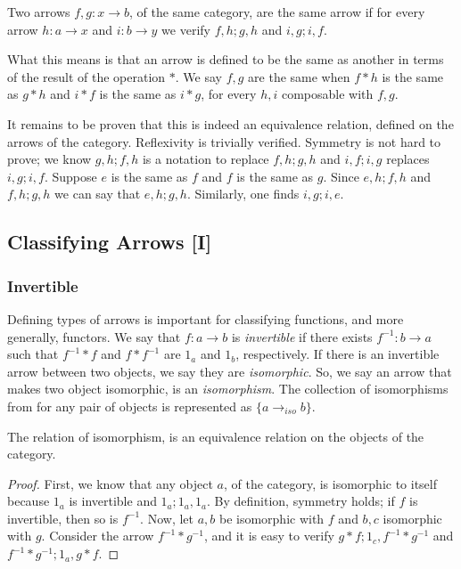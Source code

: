 \documentclass [12pt]{book}
\begin{document}
\begin{definition}Two arrows $f,g:x\rightarrow b$, of the same category, are the same arrow if for every arrow $h:a\rightarrow x$ and $i:b\rightarrow y$ we verify $f,h;g,h$ and $i,g;i,f$.\end{definition}

What this means is that an arrow is defined to be the same as another in terms of the result of the operation $*$. We say $f,g$ are the same when $f*h$ is the same as $g*h$ and $i*f$ is the same as $i*g$, for every $h,i$ composable with $f,g$.

\newpage

It remains to be proven that this is indeed an equivalence relation, defined on the arrows of the category. Reflexivity is trivially verified. Symmetry is not hard to prove; we know $g,h;f,h$ is a notation to replace $f,h;g,h$ and $i,f;i,g$ replaces $i,g;i,f$. Suppose $e$ is the same as $f$ and $f$ is the same as $g$. Since $e,h;f,h$ and $f,h;g,h$ we can say that $e,h;g,h$. Similarly, one finds $i,g;i,e$.

		\subsection{Classifying Arrows [I]}

\subsubsection{Invertible}Defining types of arrows is important for classifying functions, and more generally, functors. We say that $f:a\rightarrow b$ is \textit{invertible} if there exists $f^{-1}:b\rightarrow a$ such that $f^{-1}*f$ and $f*f^{-1}$ are $1_a$ and $1_b$, respectively. If there is an invertible arrow between two objects, we say they are \textit{isomorphic}. So, we say an arrow that makes two object isomorphic, is an \textit{isomorphism}. The collection of isomorphisms from for any pair of objects is represented as $\{a\rightarrow_{iso}b\}$.

\begin{proposition}The relation of isomorphism, is an equivalence relation on the objects of the category.\end{proposition}

\begin{proof}First, we know that any object $a$, of the category, is isomorphic to itself because $1_a$ is invertible and $1_a;1_a,1_a$. By definition, symmetry holds; if $f$ is invertible, then so is $f^{-1}$. Now, let $a,b$ be isomorphic with $f$ and $b,c$ isomorphic with $g$. Consider the arrow $f^{-1}*g^{-1}$, and it is easy to verify $g*f;1_c,f^{-1}*g^{-1}$ and $f^{-1}*g^{-1};1_a,g*f$.\end{proof}
\end{document}
